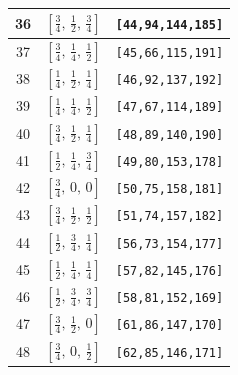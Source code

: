 \documentclass[fleqn,8pt]{jsarticle}
\begin{document}
\begin{longtable}{ccc}
36 & $\left[ \frac{3}{4},\, \frac{1}{2},\, \frac{3}{4} \right]$ & {\tt [44,94,144,185]} \\ \hline
37 & $\left[ \frac{3}{4},\, \frac{1}{4},\, \frac{1}{2} \right]$ & {\tt [45,66,115,191]} \\ \hline
38 & $\left[ \frac{1}{4},\, \frac{1}{2},\, \frac{1}{4} \right]$ & {\tt [46,92,137,192]} \\ \hline
39 & $\left[ \frac{1}{4},\, \frac{1}{4},\, \frac{1}{2} \right]$ & {\tt [47,67,114,189]} \\ \hline
40 & $\left[ \frac{3}{4},\, \frac{1}{2},\, \frac{1}{4} \right]$ & {\tt [48,89,140,190]} \\ \hline
41 & $\left[ \frac{1}{2},\, \frac{1}{4},\, \frac{3}{4} \right]$ & {\tt [49,80,153,178]} \\ \hline
42 & $\left[ \frac{3}{4},\, 0,\, 0 \right]$ & {\tt [50,75,158,181]} \\ \hline
43 & $\left[ \frac{3}{4},\, \frac{1}{2},\, \frac{1}{2} \right]$ & {\tt [51,74,157,182]} \\ \hline
44 & $\left[ \frac{1}{2},\, \frac{3}{4},\, \frac{1}{4} \right]$ & {\tt [56,73,154,177]} \\ \hline
45 & $\left[ \frac{1}{2},\, \frac{1}{4},\, \frac{1}{4} \right]$ & {\tt [57,82,145,176]} \\ \hline
46 & $\left[ \frac{1}{2},\, \frac{3}{4},\, \frac{3}{4} \right]$ & {\tt [58,81,152,169]} \\ \hline
47 & $\left[ \frac{3}{4},\, \frac{1}{2},\, 0 \right]$ & {\tt [61,86,147,170]} \\ \hline
48 & $\left[ \frac{3}{4},\, 0,\, \frac{1}{2} \right]$ & {\tt [62,85,146,171]} \\
\end{longtable}
\renewcommand{\arraystretch}{1.2}
\end{document}
